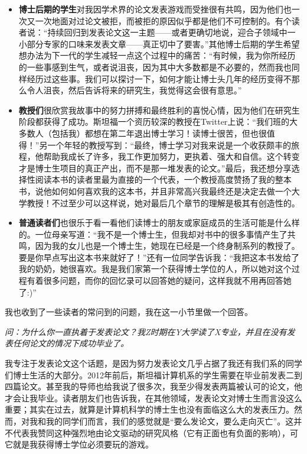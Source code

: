 \documentclass[letter,12pt]{book}
\begin{document}
\begin{CJK}{UTF8}{gbsn}
\begin{itemize}
  \item \textbf{博士后期的学生}对我因学术界的论文发表游戏而受挫很有共鸣，因为他们也一次又一次地面对过论文被拒，而被拒的原因似乎都是他们不可控制的。有个读者说：“持续回归到发表论文这一主题——或者更确切地说，迎合子领域中一小部分专家的口味来发表文章——真正切中了要害。”其他博士后期的学生希望想办法为下一代的学生减轻一点这个过程中的痛苦：“有时候，我为你所经历的一些事感到生气，或者说沮丧，因为其中大多数都是不必要的，然而我也同样经历过这些事。我们可以探讨一下，如何才能让博士头几年的经历变得不那么令人沮丧，然后告诉将来的研究生，我觉得这会很有意思。”
  \item \textbf{教授们}很欣赏我故事中的努力拼搏和最终胜利的喜悦心情，因为他们在研究生阶段都获得了成功。斯坦福一个资历较深的教授在Twitter上说：“我们班的大多数人（包括我）都想在第二年退出博士学习！读博士很苦，但也很值得！”另一个年轻的教授写到：“最终，博士学习对我来说是一个收获颇丰的旅程，他帮助我成长了许多，我工作更加努力，更执着、强大和自信。这个转变才是博士生项目的真正产出，而不是那一堆发表的论文。”最后，我还想分享选择性阅读本书的读者里最为直接的一个代表，一个教授高度赞扬了我的整本书，说他如何如何喜欢我的这本书，并且非常高兴我最终还是决定去做一个大学教授！不过至少可以这样说，她对最后几个章节的理解是极其有创造性的。
  \item \textbf{普通读者们}也很乐于看一看他们读博士的朋友或家庭成员的生活可能是什么样的。一位母亲写道：“我不是一个博士生，但我却对书中的很多事情产生了共鸣，因为我的女儿也是一个博士生，她现在已经是一个终身制系列的教授了。要是你早点写出这本书来就好了！”还有一位同学告诉我：“我把这本书发给了我的奶奶，她很喜欢。我是我们家第一个获得博士学位的人，所以她对这个过程有着很多问题，而你的回忆录可以回答她的疑问，这样我就不用再回答她了:)”
\end{itemize}

\breakline

我也收到了一些读者的常问到的问题，我在这一小节里做一个回答。

\emph{问：为什么你一直执着于发表论文？我Z时期在Y大学读了X专业，并且在没有发表任何论文的情况下成功毕业了。}

我专注于发表论文这个话题，是因为努力发表论文几乎占据了我还有我们系的同学们博士生活的大部分。2012年前后，斯坦福计算机系的学生需要在毕业前发表二到四篇论文。甚至我的导师也给我说了很多次，我至少得发表两篇被认可的论文，他才会让我毕业。读者朋友们也告诉我，在其他领域，发表论文对博士生而言没这么重要；其实在过去，就算是计算机科学的博士生也没有面临这么大的发表压力。然而，对我和我的同学们而言，我们的感觉就是“要么发论文，要么走向灭亡”。这并不代表我赞同这种强烈地由论文驱动的研究风格（它有正面也有负面的影响），可它就是我获得博士学位必须要玩的游戏。


\end{CJK}
\end{document}
